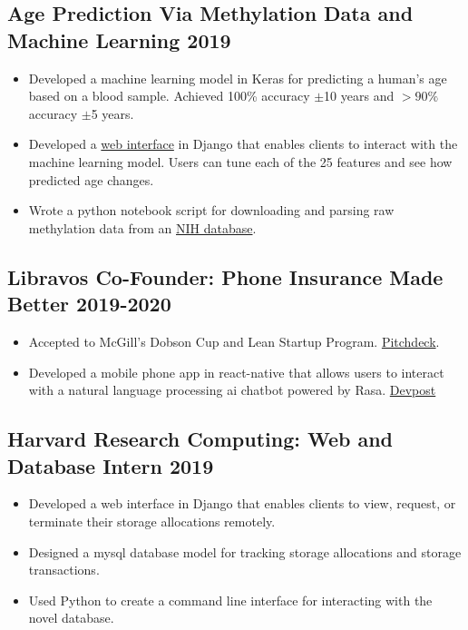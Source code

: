 \documentclass{article}
\begin{document}
\subsection{Age Prediction Via Methylation Data and Machine Learning \hfill 2019}
\begin{itemize}[leftmargin=0.5in]
  \setlength\itemsep{0.00em}
  \item Developed a machine learning model in Keras for predicting a human's age based on a blood sample. Achieved 100\% accuracy $\pm$10 years and $>90\%$ accuracy $\pm$5 years.
  \item Developed a \href{https://epigenosys.com}{web interface} in Django that enables clients to interact with the machine learning model. Users can tune each of the 25 features and see how predicted age changes.
  \item Wrote a python notebook script for downloading and parsing raw methylation data from an \href{https://www.ncbi.nlm.nih.gov/geo/query/acc.cgi?acc=GSE87571}{NIH database}.
\end{itemize}

\subsection{Libravos Co-Founder: Phone Insurance Made Better \hfill 2019-2020}
\begin{itemize}[leftmargin=0.5in]
  \setlength\itemsep{0.00em}
\item Accepted to McGill's Dobson Cup and Lean Startup Program. \href{https://docs.google.com/presentation/d/1mExXYPrHCWZ_4uRn0mu0f3_F_bhrw97eSgIJtMoN90k/edit?usp=sharing}{Pitchdeck}.
\item Developed a mobile phone app in react-native that allows users to interact with a natural language processing ai chatbot powered by Rasa. \href{https://devpost.com/software/libravos-mobile-app-with-chat-bot}{Devpost}
\end{itemize}

\subsection{Harvard Research Computing: Web and Database Intern \hfill 2019}
\begin{itemize}[leftmargin=0.5in]
  \setlength\itemsep{0.00em}
  \item Developed a web interface in Django that enables clients to view, request, or terminate their storage allocations remotely.
  \item Designed a mysql database model for tracking storage allocations and storage transactions.
  \item Used Python to create a command line interface for interacting with the novel database.
\end{itemize}
\end{document}
